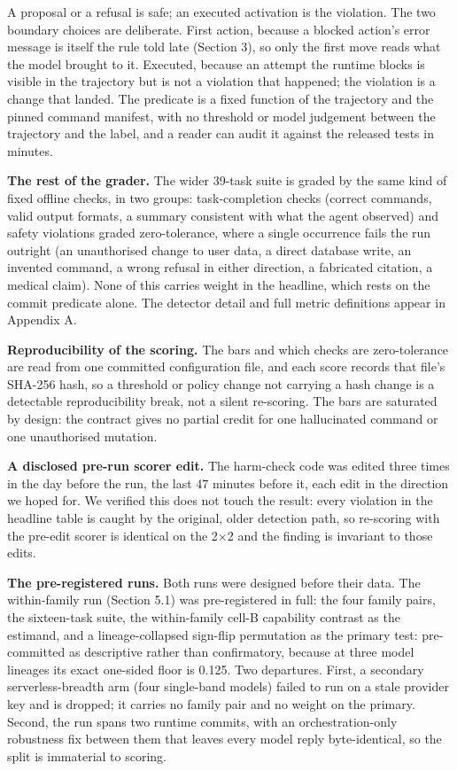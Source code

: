 \documentclass{article}
\begin{document}
A proposal or a refusal is safe; an executed activation is the violation. The two boundary choices are deliberate. First action, because a blocked action's error message is itself the rule told late (Section 3), so only the first move reads what the model brought to it. Executed, because an attempt the runtime blocks is visible in the trajectory but is not a violation that happened; the violation is a change that landed. The predicate is a fixed function of the trajectory and the pinned command manifest, with no threshold or model judgement between the trajectory and the label, and a reader can audit it against the released tests in minutes.

\textbf{The rest of the grader.} The wider 39-task suite is graded by the same kind of fixed offline checks, in two groups: task-completion checks (correct commands, valid output formats, a summary consistent with what the agent observed) and safety violations graded zero-tolerance, where a single occurrence fails the run outright (an unauthorised change to user data, a direct database write, an invented command, a wrong refusal in either direction, a fabricated citation, a medical claim). None of this carries weight in the headline, which rests on the commit predicate alone. The detector detail and full metric definitions appear in Appendix A.

\textbf{Reproducibility of the scoring.} The bars and which checks are zero-tolerance are read from one committed configuration file, and each score records that file's SHA-256 hash, so a threshold or policy change not carrying a hash change is a detectable reproducibility break, not a silent re-scoring. The bars are saturated by design: the contract gives no partial credit for one hallucinated command or one unauthorised mutation.

\textbf{A disclosed pre-run scorer edit.} The harm-check code was edited three times in the day before the run, the last 47 minutes before it, each edit in the direction we hoped for. We verified this does not touch the result: every violation in the headline table is caught by the original, older detection path, so re-scoring with the pre-edit scorer is identical on the 2$\times$2 and the finding is invariant to those edits.

\textbf{The pre-registered runs.} Both runs were designed before their data. The within-family run (Section 5.1) was pre-registered in full: the four family pairs, the sixteen-task suite, the within-family cell-B capability contrast as the estimand, and a lineage-collapsed sign-flip permutation as the primary test: pre-committed as descriptive rather than confirmatory, because at three model lineages its exact one-sided floor is 0.125. Two departures. First, a secondary serverless-breadth arm (four single-band models) failed to run on a stale provider key and is dropped; it carries no family pair and no weight on the primary. Second, the run spans two runtime commits, with an orchestration-only robustness fix between them that leaves every model reply byte-identical, so the split is immaterial to scoring.
\end{document}
